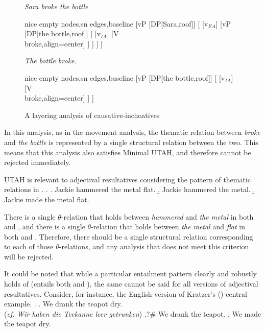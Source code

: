 \documentclass[MilwayThesis]{subfiles}
\begin{document}
\begin{figure}[h]
	\centering
	\begin{minipage}[t]{0.45\textwidth}
		\textit{Sara broke the bottle}\\
		\begin{forest}
		  nice empty nodes,sn edges,baseline
		  [vP
		    [DP[Sara,roof]]
		    [
		      [v$_{EA}$]
		      [vP
			[DP[the bottle,roof]]
			[
			  [v$_{IA}$]
			  [V\\broke,align=center]
			]
		      ]
		    ]
		  ]
		\end{forest}	
	\end{minipage}
	\begin{minipage}[t]{0.45\textwidth}
		\textit{The bottle broke.}\\
		\begin{forest}
		  nice empty nodes,sn edges,baseline
		  [vP
		    [DP[the bottle,roof]]
		    [
		      [v$_{IA}$]
		      [V\\broke,align=center]
		    ]
		  ]
		\end{forest}
	\end{minipage}
	\caption{A layering analysis of causative-inchoatives}
	\label{fig:layering}
\end{figure}
In this analysis, as in the movement analysis, the thematic relation between \textit{broke} and \textit{the bottle} is represented by a single structural relation between the two.
This means that this analysis also satisfies Minimal UTAH, and therefore cannot be rejected immediately.

UTAH is relevant to adjectival resultatives considering the pattern of thematic relations in \Next.
\ex.
\a. Jackie hammered the metal flat.
\b. Jackie hammered the metal.
\b. Jackie made the metal flat.

There is a single $\theta$-relation that holds between \textit{hammered} and \textit{the metal} in both \Last[a] and \Last[b], and there is a single $\theta$-relation that holds between \textit{the metal} and \textit{flat} in  both \Last[a] and \Last[c]. 
Therefore, there should be a single structural relation corresponding to each of those $\theta$-relations, and any analysis that does not meet this criterion will be rejected.

It could be noted that while a particular entailment pattern clearly and robustly holds of \Last (\Last[a] entails both \Last[b] and \Last[c]), the same cannot be said for all versions of adjectival resultatives.
Consider, for instance, \Next the English version of Kratzer's (\citeyear{kratzer2004building}) central example.
\ex. 
\a. We drank the teapot dry.\\
(\textit{cf.} \textit{Wir haben die Teekanne leer getrunken})
\b.?\# We drank the teapot.
\b. We made the teapot dry. 
\end{document}
